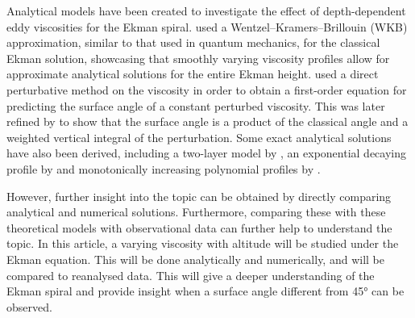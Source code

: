 Analytical models have been created to investigate the effect of depth-dependent eddy viscosities for the Ekman spiral. \citet{grisogono1995} used a Wentzel--Kramers--Brillouin (WKB) approximation, similar to that used in quantum mechanics, for the classical Ekman solution, showcasing that smoothly varying viscosity profiles allow for approximate analytical solutions for the entire Ekman height. \citet{bressan2019} used a direct perturbative method on the viscosity in order to obtain a first-order equation for predicting the surface angle of a constant perturbed viscosity. This was later refined by \citet{constantin2021} to show that the surface angle is a product of the classical angle and a weighted vertical integral of the perturbation. Some exact analytical solutions have also been derived, including a two-layer model by \citet{dritschel2020, guan2023}, an exponential decaying profile by \citet{miles1994} and monotonically increasing polynomial profiles by \citet{ionescu-kruse2021,guan2023}.

However, further insight into the topic can be obtained by directly comparing analytical and numerical solutions. Furthermore, comparing these with these theoretical models with observational data can further help to understand the topic. In this article, a varying viscosity with altitude will be studied under the Ekman equation. This will be done analytically and numerically, and will be compared to reanalysed data. This will give a deeper understanding of the Ekman spiral and provide insight when a surface angle different from \ang{45} can be observed.
